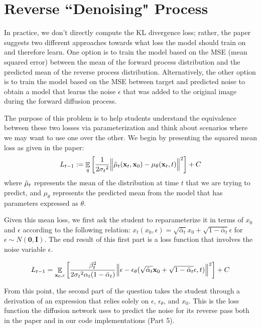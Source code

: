 \documentclass{article}
\DeclareMathOperator{\EX}{\mathbb{E}}%
\begin{document}
\section{Reverse ``Denoising" Process}

In practice, we don't directly compute the KL divergence loss;
rather, the paper suggests two different approaches towards what loss the model should train on and therefore learn.
One option is to train the model based on the MSE (mean squared error) between the mean of the forward process distribution and the predicted mean of the reverse process distribution. 
Alternatively, the other option is to train the model based on the MSE between target and predicted noise to obtain a model that learns the noise $\epsilon$ that was added to the original image during the forward diffusion process.

The purpose of this problem is to help students understand the equivalence between these two losses via parameterization and think about scenarios where we may want to use one over the other. We begin by presenting the squared mean loss as given in the paper: 
\begin{equation}
    L_{t-1} := \EX_q\left[\frac{1}{2{\sigma_t}^2}
    \Big\lVert {\Tilde\mu_t}(\textbf{x}_t, \textbf{x}_0) - {\mu_\theta}(\textbf{x}_t, t)\Big\rVert^2\right] + C
\end{equation}
where $\Tilde{\mu}_t$ represents the mean of the distribution at time $t$ that we are trying to predict,
and $\mu_{\theta}$ represents the predicted mean from the model that has parameters expressed as $\theta$.

Given this mean loss, we first ask the student to reparameterize it in terms of $x_0$ and $\epsilon$ according to the following relation: 
${x_t}(x_0, \epsilon) = \sqrt{\bar\alpha_t}x_0 + \sqrt{1 - \bar\alpha_t}\epsilon $  for $\epsilon \sim N(\boldsymbol{0}, \boldsymbol{I})$. The end result of this first part is a loss function that involves the noise variable $\epsilon$.

\begin{equation}
    L_{t-1} = \EX_{\textbf{x}_0, \epsilon}\left[\frac{\beta_t^2}{2{\sigma_t}^2\alpha_t(1 - \Bar{\alpha}_t)}
    \Big\lVert \epsilon - \epsilon_\theta(\sqrt{\Bar{\alpha}_t}\textbf{x}_0 + \sqrt{1 - \Bar{\alpha}_t}\epsilon, t)\Big\rVert^2\right] + C
\end{equation}

From this point, the second part of the question takes the student through a derivation of an expression that relies solely on $\epsilon$, $\epsilon_\theta$, and $x_0$. This is the loss function the diffusion network uses to predict the noise for its reverse pass both in the paper and in our code implementations (Part 5). 
\end{document}
